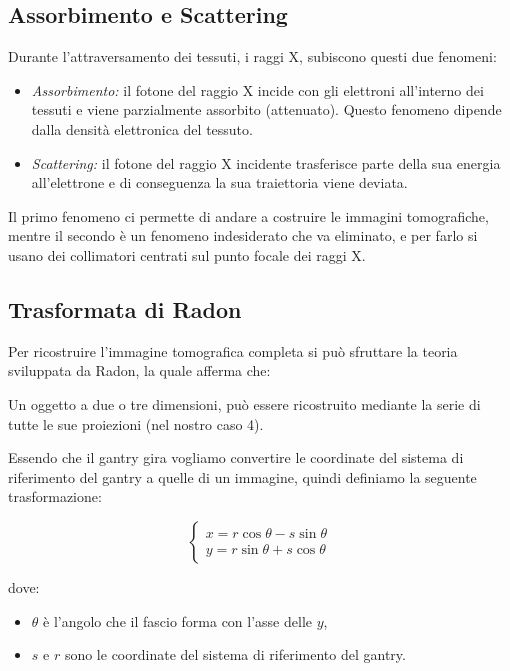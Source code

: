 \subsection{Assorbimento e Scattering}

Durante l'attraversamento dei tessuti, i raggi X, subiscono questi due fenomeni:

\begin{itemize}
    \item \textit{Assorbimento:} il fotone del raggio X incide con gli elettroni
          all'interno dei tessuti e viene parzialmente assorbito (attenuato).
          Questo fenomeno dipende dalla densità elettronica del tessuto.
    \item  \textit{Scattering:} il fotone del raggio X incidente trasferisce parte della
          sua energia all'elettrone e di conseguenza la sua traiettoria viene deviata.
\end{itemize}

Il primo fenomeno ci permette di andare a costruire le immagini tomografiche,
mentre il secondo è un fenomeno indesiderato che va eliminato, e per farlo si
usano dei collimatori centrati sul punto focale dei raggi X.

\subsection{Trasformata di Radon}

Per ricostruire l'immagine tomografica completa si può sfruttare la teoria
sviluppata da Radon, la quale afferma che:

\begin{definition}
    Un oggetto a due o tre dimensioni, può essere ricostruito mediante la serie
    di tutte le sue proiezioni (nel nostro caso 4).
\end{definition}

Essendo che il gantry gira vogliamo convertire le coordinate del sistema
di riferimento del gantry a quelle di un immagine, quindi definiamo la seguente
trasformazione:

$$
    \begin{cases}
        x = r \cos \theta - s \sin \theta \\
        y = r \sin \theta + s \cos \theta
    \end{cases}
$$

dove:
\begin{itemize}
    \item $\theta$ è l'angolo che il fascio forma con l'asse delle $y$,
    \item $s$ e $r$ sono le coordinate del sistema di riferimento del gantry.
\end{itemize}

